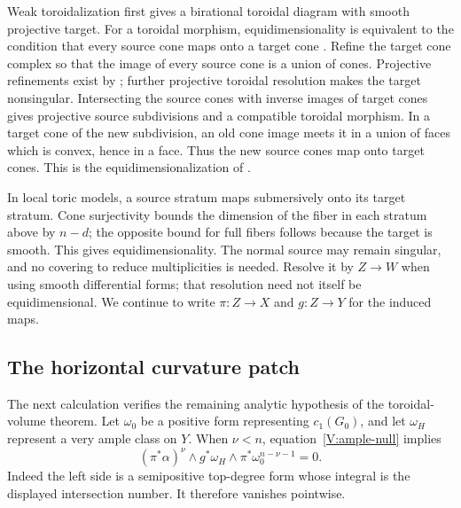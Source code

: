 Weak toroidalization \cite[Theorem~1.1]{ADK2013} first gives a
birational toroidal diagram with smooth projective target. For a
toroidal morphism, equidimensionality is equivalent to the condition
that every source cone maps onto a target cone
\cite[Lemma~4.1 and Remark~4.2]{AK2000}. Refine the target cone
complex so that the image of every source cone is a union of cones.
Projective refinements exist by \cite[Lemma~4.3]{AK2000}; further
projective toroidal resolution makes the target nonsingular. Intersecting
the source cones with inverse images of target cones gives projective
source subdivisions and a compatible toroidal morphism. In a target
cone of the new subdivision, an old cone image meets it in a union of
faces which is convex, hence in a face. Thus the new source cones map
onto target cones. This is the equidimensionalization of
\cite[Proposition~4.4]{AK2000}.

In local toric models, a source stratum maps submersively onto its
target stratum. Cone surjectivity bounds the dimension of the fiber in
each stratum above by $n-d$; the opposite bound for full fibers follows
because the target is smooth. This gives equidimensionality. The normal
source may remain singular, and no covering to reduce multiplicities
is needed. Resolve it by $Z\to W$ when using smooth differential forms;
that resolution need not itself be equidimensional. We continue to write
$\pi:Z\to X$ and $g:Z\to Y$ for the induced maps.

\subsection{The horizontal curvature patch}
The next calculation verifies the remaining analytic hypothesis of the
toroidal-volume theorem. Let $\omega_0$ be a positive form representing
$c_1(G_0)$, and let $\omega_H$ represent a very ample class on $Y$.
When $\nu<n$, equation~\eqref{V:ample-null} implies
\begin{equation}\label{V:vanishing-form}
 (\pi^*\alpha)^\nu\wedge g^*\omega_H
       \wedge\pi^*\omega_0^{n-\nu-1}=0.
\end{equation}
Indeed the left side is a semipositive top-degree form whose integral
is the displayed intersection number. It therefore vanishes pointwise.

